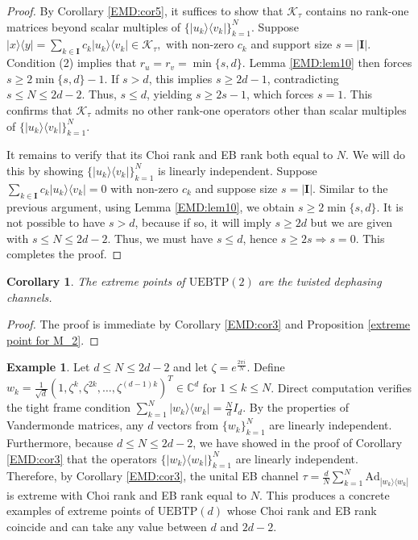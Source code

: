 \documentclass[11pt,reqno]{amsart}
\theoremstyle{definition}
\newtheorem{eg}[defn]{Example}
\theoremstyle{plain}
\newtheorem{cor}[defn]{Corollary}
\theoremstyle{remark}
\newcommand{\la}{\langle}
\newcommand{\ra}{\rangle}
\numberwithin{equation}{section}%
\begin{document}
\begin{proof}
	By Corollary \ref{EMD:cor5}, it suffices to show that $\mathscr{K}_\tau$ contains no rank-one matrices beyond scalar multiples of $\{|u_k\ra\la v_k|\}_{k=1}^N$. Suppose $|x\ra\la y| = \sum_{k\in\mathbf{I}} c_k |u_k\ra\la v_k| \in \mathscr{K}_\tau ,$ with non-zero $c_k$ and support size $s = |\mathbf{I}|$. Condition (2) implies that $r_u = r_v = \min\{s, d\}$. Lemma \ref{EMD:lem10} then forces $s \ge 2\min\{s, d\} - 1$. If $s > d$, this implies $s \ge 2d - 1$, contradicting $s \le N \le 2d - 2$. Thus, $s \le d$, yielding $s \ge 2s - 1$, which forces $s=1$. This confirms that $\mathscr{K}_\tau$ admits no other rank-one operators other than scalar multiples of $\{|u_k\ra\la v_k|\}_{k=1}^N$.
	
	It remains to verify that its Choi rank and EB rank both equal to $N$. We will do this by showing $\{|u_k\ra\la v_k|\}_{k=1}^N$ is linearly independent. Suppose $\sum_{k\in\mathbf{I}}c_k|u_k\ra\la v_k|=0$ with non-zero $c_k$ and suppose size $s=|\mathbf{I}|$. Similar to the previous argument, using Lemma \ref{EMD:lem10}, we obtain $s\ge 2\min\{s,d\}$. It is not possible to have $s>d$, because if so, it will imply $s\ge 2d$ but we are given with $s\le N\le 2d-2$. Thus, we must have $s\le d$, hence $s\ge 2s\Rightarrow s=0$. This completes the proof.
\end{proof}


 \begin{cor}\label{EMD:cor7}
	The extreme points of $\mathrm{UEBTP}(2)$ are the twisted dephasing channels.
\end{cor}

\begin{proof}
	The proof is immediate by Corollary \ref{EMD:cor3} and Proposition \ref{extreme point for M_2}.
\end{proof}




\begin{eg}\label{EMD:eg4}
	Let $d \le N \le 2d-2$ and let $\zeta = e^{\frac{2\pi i}{N}}$. Define $w_k = \frac{1}{\sqrt{d}}(1, \zeta^k, \zeta^{2k}, \ldots, \zeta^{(d-1)k})^T \in \mathbb{C}^d$ for $1 \le k \le N$. Direct computation verifies the tight frame condition $\sum_{k=1}^N |w_k\ra\la w_k| = \frac{N}{d}I_d$. By the properties of Vandermonde matrices, any $d$ vectors from $\{w_k\}_{k=1}^N$ are linearly independent. Furthermore, because $d\leq N \le 2d-2 $, we have showed in the proof of Corollary \ref{EMD:cor3} that the operators $\{|w_k\ra\la w_k|\}_{k=1}^N$ are linearly independent. Therefore, by Corollary \ref{EMD:cor3}, the unital EB channel $\tau = \frac{d}{N}\sum_{k=1}^N \text{Ad}_{|w_k\ra\la w_k|}$ is extreme with Choi rank and EB rank equal to $N$. This produces a concrete examples of extreme points of $\mathrm{UEBTP}(d)$ whose Choi rank and EB rank coincide and can take any value between $d$ and $2d-2$.
\end{eg}
\end{document}
